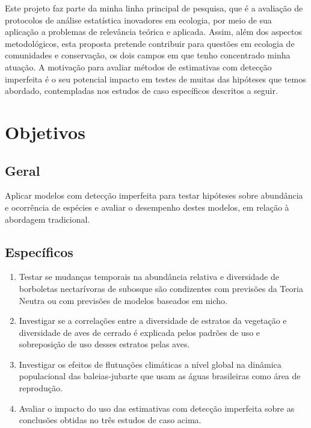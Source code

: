 \documentclass[12pt, A4]{article}
\begin{document}
Este projeto faz parte da minha linha principal de pesquisa, que é a
avaliação de protocolos de análise estatística inovadores em ecologia,
por meio de sua aplicação a problemas de relevância teórica e
aplicada. Assim, além dos aspectos metodológicos, esta proposta
pretende contribuir para questões em ecologia de comunidades e
conservação, os dois campos em que tenho concentrado minha atuação. A
motivação para avaliar métodos de estimativas com detecção imperfeita
é o seu potencial impacto em testes de muitas das hipóteses que temos
abordado, contempladas nos estudos de caso específicos descritos a
seguir. 

\section{Objetivos}
\label{sec:objetivos}

\subsection*{Geral}
\label{sec:geral}
Aplicar modelos com detecção imperfeita para testar hipóteses
sobre abundância e ocorrência de espécies e avaliar o desempenho
destes modelos, em relação à abordagem tradicional. 

\subsection*{Específicos}
\label{sec:especificos}

\begin{enumerate}
\item Testar se mudanças temporais na abundância relativa e
  diversidade de borboletas nectarívoras de subosque  
  são condizentes com previsões da Teoria Neutra ou com
  previsões de modelos baseados em nicho. 
\item Investigar se a correlações entre a diversidade de estratos da
  vegetação e diversidade de aves de cerrado é explicada pelos padrões
  de uso e sobreposição de uso desses estratos pelas aves.
\item Investigar os efeitos de flutuações climáticas a nível global na
  dinâmica populacional das baleias-jubarte que usam as águas
  brasileiras como área de reprodução.
\item Avaliar o impacto do uso das estimativas com detecção imperfeita
  sobre as conclusões obtidas no três estudos de caso acima.
\end{enumerate}
\end{document}
